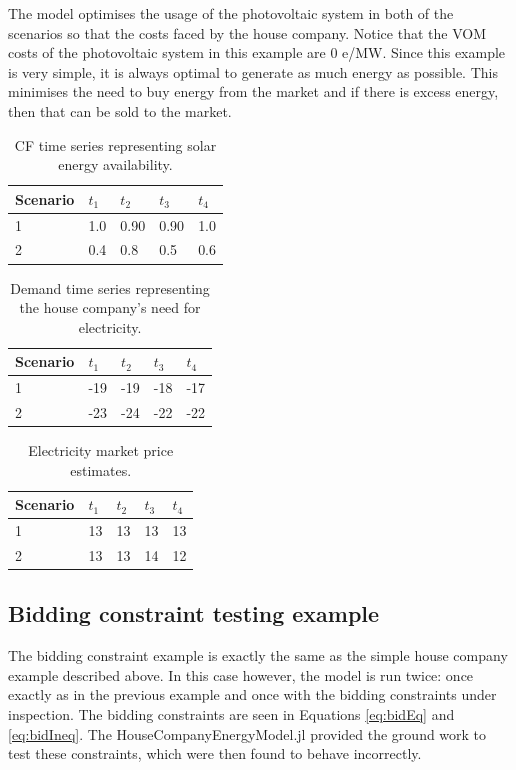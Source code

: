 \documentclass{article}
\begin{document}
The model optimises the usage of the photovoltaic system in both of the scenarios so that the costs faced by the house company. Notice that the VOM costs of the photovoltaic system in this example are 0 e/MW. Since this example is very simple, it is always optimal to generate as much energy as possible. This minimises the need to buy energy from the market and if there is excess energy, then that can be sold to the market.

\begin{table}[H]
\caption{CF time series representing solar energy availability.}
\label{tbl:solar}
\centering
\begin{tabular}{ l | l l l l }
Scenario    &   $t_1$ &   $t_2$ &   $t_3$ &   $t_4$\\
\midrule
1 & 1.0 & 0.90 & 0.90 & 1.0 \\
2 & 0.4 & 0.8 & 0.5 & 0.6 \\
\end{tabular}
\end{table}

\begin{table}[H]
\caption{Demand time series representing the house company's need for electricity.}
\label{tbl:demand}
\centering
\begin{tabular}{ l | l l l l }
Scenario    &   $t_1$ &   $t_2$ &   $t_3$ &   $t_4$\\
\midrule
1 & -19 & -19 & -18 & -17 \\
2 & -23 & -24 & -22 & -22 \\
\end{tabular}
\end{table}

\begin{table}[H]
\caption{Electricity market price estimates.}
\label{tbl:prices}
\centering
\begin{tabular}{ l | l l l l }
Scenario    &   $t_1$ &   $t_2$ &   $t_3$ &   $t_4$\\
\midrule
1 & 13 & 13 & 13 & 13 \\
2 & 13 & 13 & 14 & 12 \\
\end{tabular}
\end{table}


\subsection{Bidding constraint testing example}

The bidding constraint example is exactly the same as the simple house company example described above. In this case however, the model is run twice: once exactly as in the previous example and once with the bidding constraints under inspection. The bidding constraints are seen in Equations \eqref{eq:bidEq} and \eqref{eq:bidIneq}. The HouseCompanyEnergyModel.jl provided the ground work to test these constraints, which were then found to behave incorrectly.
\end{document}

